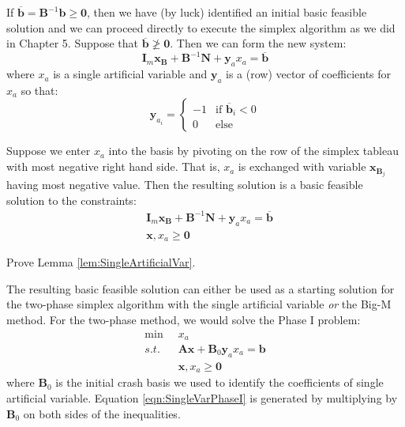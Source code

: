 If $\overline{\mathbf{b}} = \mathbf{B}^{-1}\mathbf{b}  \geq \mathbf{0}$, then we have (by luck) identified an initial basic feasible solution and we can proceed directly to execute the simplex algorithm as we did in Chapter 5. Suppose that $\overline{\mathbf{b}} \not\geq \mathbf{0}$. Then we can form the new system:
\begin{equation}
\mathbf{I}_m\mathbf{x}_\mathbf{B} + \mathbf{B}^{-1}\mathbf{N} + \mathbf{y}_ax_a = \overline{\mathbf{b}}
\end{equation}
where $x_a$ is a single artificial variable and $\mathbf{y}_a$ is a (row) vector of coefficients for $x_a$ so that:
\begin{equation}
\mathbf{y}_{a_i} = \begin{cases}
-1 & \text{if $\overline{\mathbf{b}}_i < 0$}\\
0 & \text{else}
\end{cases}
\end{equation}
\begin{lemma} Suppose we enter $x_a$ into the basis by pivoting on the row of the simplex tableau with most negative right hand side. That is, $x_a$ is exchanged with variable $\mathbf{x}_{\mathbf{B}_j}$ having most negative value. Then the resulting solution is a basic feasible solution to the constraints:
\begin{equation}
\begin{aligned}
&\mathbf{I}_m\mathbf{x}_\mathbf{B} + \mathbf{B}^{-1}\mathbf{N} + \mathbf{y}_ax_a = \overline{\mathbf{b}}\\
&\mathbf{x}, x_a \geq \mathbf{0}
\end{aligned}
\end{equation}
\label{lem:SingleArtificialVar}
\end{lemma}
\begin{exercise} Prove Lemma \ref{lem:SingleArtificialVar}.
\end{exercise}
The resulting basic feasible solution can either be used as a starting solution for the two-phase simplex algorithm with the single artificial variable \textit{or} the Big-M method. For the two-phase method, we would solve the Phase I problem:
\begin{equation}
\begin{aligned}
\min\;\; & x_a\\
s.t.\;\; & \mathbf{A}\mathbf{x} + \mathbf{B}_0\mathbf{y}_a x_a = \mathbf{b}\\
&\mathbf{x},x_a \geq \mathbf{0}
\end{aligned}
\label{eqn:SingleVarPhaseI}
\end{equation}
where $\mathbf{B}_0$ is the initial crash basis we used to identify the coefficients of single artificial variable. Equation \ref{eqn:SingleVarPhaseI} is generated by multiplying by $\mathbf{B}_0$ on both sides of the inequalities.

